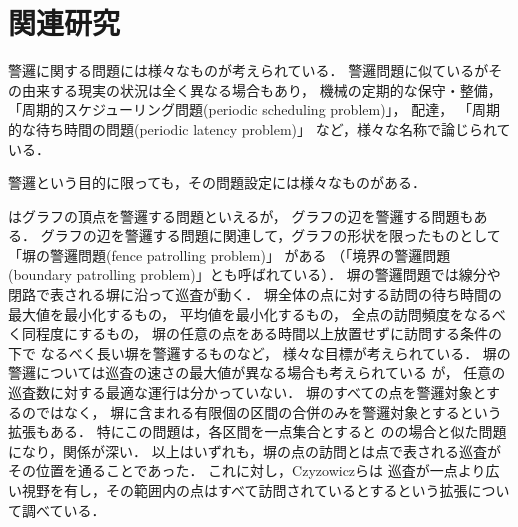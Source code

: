 \section{関連研究}
\label{section: relatedWorks}

警邏に関する問題には様々なものが考えられている．
警邏問題に似ているがその由来する現実の状況は全く異なる場合もあり，
機械の定期的な保守・整備\cite{ANILY199827, bar2002minimizing}，
「周期的スケジューリング問題(periodic scheduling problem)」\cite{sgall2009periodic}，
配達\cite{campbell2005vehicle}，
「周期的な待ち時間の問題(periodic latency problem)」\cite{coene2011charlemagne}
など，様々な名称で論じられている．


警邏という目的に限っても，その問題設定には様々なものがある．


{\PPProfit}はグラフの頂点を警邏する問題といえるが，
グラフの辺を警邏する問題もある\cite{yanovski2003distributed}．
%
グラフの辺を警邏する問題に関連して，グラフの形状を限ったものとして
「塀の警邏問題(fence patrolling problem)」\cite{
    czyzowicz2011boundary,
    dumitrescu2014fence,
    elmaliach2008realistic,
    collins2013optimal}%
がある
（「境界の警邏問題(boundary patrolling problem)」とも呼ばれている）．
塀の警邏問題では線分や閉路で表される塀に沿って巡査が動く．
塀全体の点に対する訪問の待ち時間の最大値を最小化するもの\cite{dumitrescu2014fence, elmaliach2008realistic}，
平均値を最小化するもの\cite{elmaliach2008realistic}，
全点の訪問頻度をなるべく同程度にするもの\cite{elmaliach2008frequency}，
塀の任意の点をある時間以上放置せずに訪問する条件の下で
なるべく長い塀を警邏するもの\cite{czyzowicz2011boundary}など，
様々な目標が考えられている．
%
塀の警邏については巡査の速さの最大値が異なる場合も考えられている
\cite{czyzowicz2011boundary, czyzowicz2016fence, kawamura2015fence}が，
任意の巡査数に対する最適な運行は分かっていない．
%
塀のすべての点を警邏対象とするのではなく，
塀に含まれる有限個の区間の合併のみを警邏対象とするという拡張もある\cite{collins2013optimal}．
特にこの問題は，各区間を一点集合とすると
{\PPProfit}の{\graphLine}の場合と似た問題になり，関係が深い．
%
以上はいずれも，塀の点の訪問とは点で表される巡査がその位置を通ることであった．
これに対し，Czyzowiczら\cite{czyzowicz2014patrolling}は
巡査が一点より広い視野を有し，その範囲内の点はすべて訪問されているとするという拡張について調べている．



